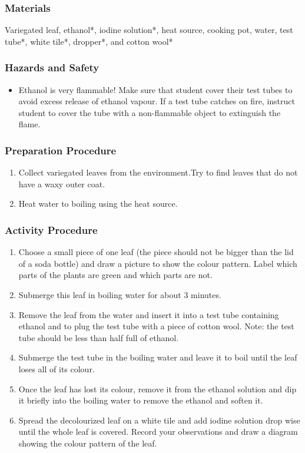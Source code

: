 \subsubsection*{Materials}
Variegated leaf, ethanol*, iodine solution*, heat source, cooking pot, water, test tube*, white tile*, dropper*, and cotton wool*

\subsubsection*{Hazards and Safety}
\begin{itemize}
\item{Ethanol is very flammable! Make sure that student cover their test tubes to avoid excess release of ethanol vapour. If a test tube catches on fire, instruct student to cover the tube with a non-flammable object to extinguish the flame.}
\end{itemize}

\subsubsection*{Preparation Procedure}
\begin{enumerate}
\item{Collect variegated leaves from the environment.Try to find leaves that do not have a waxy outer coat.}
\item{Heat water to boiling using the heat source.}
\end{enumerate}

\subsubsection*{Activity Procedure}
\begin{enumerate}
\item{Choose a small piece of one leaf (the piece should not be bigger than the lid of a soda bottle) and draw a picture to show the colour pattern. Label which parts of the plants are green and which parts are not.}
\item{Submerge this leaf in boiling water for about 3 minutes.}
\item{Remove the leaf from the water and insert it into a test tube containing ethanol and to plug the test tube with a piece of cotton wool. Note: the test tube should be less than half full of ethanol.}
\item{Submerge the test tube in the boiling water and leave it to boil until the leaf loses all of its colour.}
\item{Once the leaf has lost its colour, remove it from the ethanol solution and dip it briefly into the boiling water to remove the ethanol and soften it.}
\item{Spread the decolourized leaf on a white tile and add iodine solution drop wise until the whole leaf is covered. Record your observations and draw a diagram showing the colour pattern of the leaf.}
\end{enumerate}

